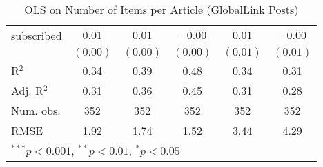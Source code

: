 \begin{table}[!h]
\begin{center}
\begin{tabular}{l c c c c c }
subscribed              & $0.01$       & $0.01$       & $-0.00$      & $0.01$       & $-0.00$      \\
                        & $(0.00)$     & $(0.00)$     & $(0.00)$     & $(0.01)$     & $(0.01)$     \\
\midrule
R$^2$                   & 0.34         & 0.39         & 0.48         & 0.34         & 0.31         \\
Adj. R$^2$              & 0.31         & 0.36         & 0.45         & 0.31         & 0.28         \\
Num. obs.               & 352          & 352          & 352          & 352          & 352          \\
RMSE                    & 1.92         & 1.74         & 1.52         & 3.44         & 4.29         \\
\bottomrule
\multicolumn{6}{l}{\scriptsize{$^{***}p<0.001$, $^{**}p<0.01$, $^*p<0.05$}}
\end{tabular}
\caption{OLS on Number of Items per Article (GlobalLink Posts)}
\label{table:coefficients}
\end{center}
\end{table}
